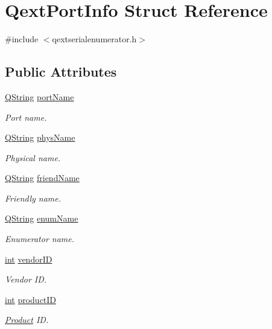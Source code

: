 \hypertarget{struct_qext_port_info}{\section{Qext\-Port\-Info Struct Reference}
\label{struct_qext_port_info}
}


{\ttfamily \#include $<$qextserialenumerator.\-h$>$}

\subsection*{Public Attributes}
\begin{DoxyCompactItemize}
\item 
\hyperlink{group___u_a_v_objects_plugin_gab9d252f49c333c94a72f97ce3105a32d}{Q\-String} \hyperlink{struct_qext_port_info_ab28ecc59f84babdf486ab5fad74e024a}{port\-Name}
\begin{DoxyCompactList}\small\item\em Port name. \end{DoxyCompactList}\item 
\hyperlink{group___u_a_v_objects_plugin_gab9d252f49c333c94a72f97ce3105a32d}{Q\-String} \hyperlink{struct_qext_port_info_a9bb0593dbd5bc1a0fc081e61268eaf46}{phys\-Name}
\begin{DoxyCompactList}\small\item\em Physical name. \end{DoxyCompactList}\item 
\hyperlink{group___u_a_v_objects_plugin_gab9d252f49c333c94a72f97ce3105a32d}{Q\-String} \hyperlink{struct_qext_port_info_a1bf41f0d6c577f87161f4fdb077fb952}{friend\-Name}
\begin{DoxyCompactList}\small\item\em Friendly name. \end{DoxyCompactList}\item 
\hyperlink{group___u_a_v_objects_plugin_gab9d252f49c333c94a72f97ce3105a32d}{Q\-String} \hyperlink{struct_qext_port_info_a47a6287c969ce9797b87f9ffdf36763c}{enum\-Name}
\begin{DoxyCompactList}\small\item\em Enumerator name. \end{DoxyCompactList}\item 
\hyperlink{ioapi_8h_a787fa3cf048117ba7123753c1e74fcd6}{int} \hyperlink{struct_qext_port_info_a41e550f44b17021fbdd0ea3f2e896fcc}{vendor\-I\-D}
\begin{DoxyCompactList}\small\item\em Vendor I\-D. \end{DoxyCompactList}\item 
\hyperlink{ioapi_8h_a787fa3cf048117ba7123753c1e74fcd6}{int} \hyperlink{struct_qext_port_info_aff45380c6ad0250cfd8628032f45e948}{product\-I\-D}
\begin{DoxyCompactList}\small\item\em \hyperlink{class_product}{Product} I\-D. \end{DoxyCompactList}\end{DoxyCompactItemize}


